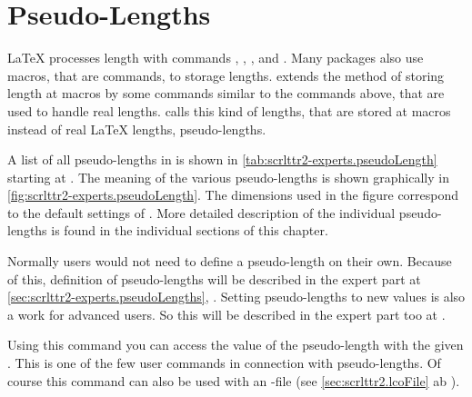 \section{Pseudo-Lengths}
\label{sec:scrlttr2.pseudoLength}

\LaTeX{} processes length with commands , ,
, and . Many packages also use
macros, that are commands, to storage lengths. \KOMAScript{} extends the
method of storing length at macros by some commands similar to the commands
above, that are used to handle real lengths. \KOMAScript calls this kind of
lengths, that are stored at macros instead of real \LaTeX{} lengths,
pseudo-lengths.

A list of all pseudo-lengths in  is shown in
\autoref{tab:scrlttr2-experts.pseudoLength} starting at
. The meaning of the various
pseudo-lengths is shown graphically in
\autoref{fig:scrlttr2-experts.pseudoLength}. The dimensions used in the figure
correspond to the default settings of . More detailed
description of the individual pseudo-lengths is found in the individual
sections of this chapter.

Normally users would not need to define a pseudo-length on their own. Because
of this, definition of pseudo-lengths will be described in the expert part at
\autoref{sec:scrlttr2-experts.pseudoLengths},
. Setting pseudo-lengths to
new values is also a work for advanced users. So this will be described in the
expert part too at .


\begin{Declaration}
\end{Declaration}
%
Using this command you can access the value of the pseudo-length with
the given . This is one of the few user commands in
connection with pseudo-lengths. Of course this command can also be
used with an -file (see
\autoref{sec:scrlttr2.lcoFile} ab ).%
%
%


